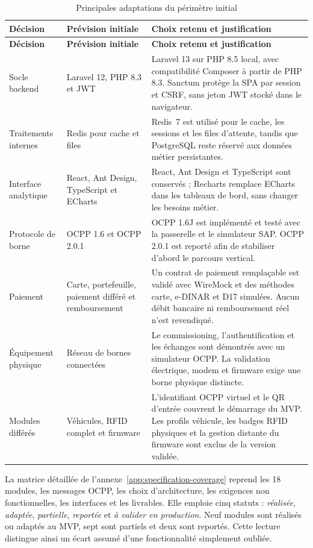 \begin{longtable}{|p{3.0cm}|p{4.5cm}|p{6.8cm}|}
  \caption{Principales adaptations du périmètre initial}
  \label{tab:scope-main-adaptations}\\
  \hline
  \textbf{Décision} & \textbf{Prévision initiale} & \textbf{Choix retenu et justification}\\
  \hline
  \endfirsthead
  \hline
  \textbf{Décision} & \textbf{Prévision initiale} & \textbf{Choix retenu et justification}\\
  \hline
  \endhead
  Socle backend & Laravel 12, PHP 8.3 et JWT &
  Laravel 13 sur PHP 8.5 local, avec compatibilité Composer à partir de PHP 8.3.
  Sanctum protège la SPA par session et CSRF, sans jeton JWT stocké dans le
  navigateur.\\\hline
  Traitements internes & Redis pour cache et files &
  Redis~7 est utilisé pour le cache, les sessions et les files d'attente, tandis
  que PostgreSQL reste réservé aux données métier persistantes.\\\hline
  Interface analytique & React, Ant Design, TypeScript et ECharts &
  React, Ant Design et TypeScript sont conservés ; Recharts remplace ECharts
  dans les tableaux de bord, sans changer les besoins métier.\\\hline
  Protocole de borne & OCPP 1.6 et OCPP 2.0.1 &
  OCPP 1.6J est implémenté et testé avec la passerelle et le simulateur SAP.
  OCPP 2.0.1 est reporté afin de stabiliser d'abord le parcours vertical.\\\hline
  Paiement & Carte, portefeuille, paiement différé et remboursement &
  Un contrat de paiement remplaçable est validé avec WireMock et des méthodes
  carte, e-DINAR et D17 simulées. Aucun débit bancaire ni remboursement réel
  n'est revendiqué.\\\hline
  Équipement physique & Réseau de bornes connectées &
  Le commissioning, l'authentification et les échanges sont démontrés avec un
  simulateur OCPP. La validation électrique, modem et firmware exige une borne
  physique distincte.\\\hline
  Modules différés & Véhicules, RFID complet et firmware &
  L'identifiant OCPP virtuel et le QR d'entrée couvrent le démarrage du MVP.
  Les profils véhicule, les badges RFID physiques et la gestion distante du
  firmware sont exclus de la version validée.\\
  \hline
\end{longtable}

La matrice détaillée de l'annexe~\ref{app:specification-coverage} reprend les
18 modules, les messages OCPP, les choix d'architecture, les exigences non
fonctionnelles, les interfaces et les livrables. Elle emploie cinq statuts :
\emph{réalisée}, \emph{adaptée}, \emph{partielle}, \emph{reportée} et
\emph{à valider en production}. Neuf modules sont réalisés ou adaptés au MVP,
sept sont partiels et deux sont reportés. Cette lecture distingue ainsi un
écart assumé d'une fonctionnalité simplement oubliée.

